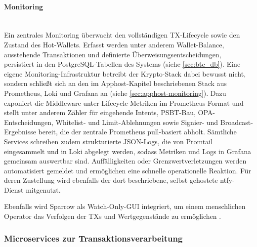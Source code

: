 \paragraph{Monitoring} \mbox{}\\
Ein zentrales Monitoring überwacht den vollständigen \ac{TX}-Lifecycle sowie den Zustand des Hot-Wallets.
Erfasst werden unter anderem Wallet-Balance, ausstehende Transaktionen und definierte Überweisungsentscheidungen, persistiert in den PostgreSQL-Tabellen des Systems (siehe \ref{sec:btc_db}).
Eine eigene Monitoring-Infrastruktur betreibt der Krypto-Stack dabei bewusst nicht, sondern schließt sich an den im Apphost-Kapitel beschriebenen Stack aus
Prometheus, Loki und Grafana an (siehe \ref{sec:apphost-monitoring}). Dazu exponiert die Middleware unter  Lifecycle-Metriken im
Prometheus-Format und stellt unter anderem Zähler für eingehende Intents, \ac{PSBT}-Bau, \ac{OPA}-Entscheidungen, Whitelist- und Limit-Ablehnungen sowie
Signier- und Broadcast-Ergebnisse bereit, die der zentrale Prometheus pull-basiert abholt.
Sämtliche Services schreiben zudem strukturierte JSON-Logs, die von Promtail eingesammelt und in Loki abgelegt werden, sodass Metriken und Logs in
Grafana gemeinsam auswertbar sind. Auffälligkeiten oder Grenzwertverletzungen werden automatisiert gemeldet und ermöglichen eine schnelle operationelle
Reaktion. Für deren Zustellung wird ebenfalls der dort beschriebene, selbst gehostete ntfy-Dienst mitgenutzt.

Ebenfalls wird Sparrow als Watch-Only-\ac{GUI} integriert, um einem menschlichen Operator das Verfolgen der \acp{TX} und Wertgegenstände zu ermöglichen \cite{Sparrow_Wallets_Features}.


\subsubsection{Microservices zur Transaktionsverarbeitung}

